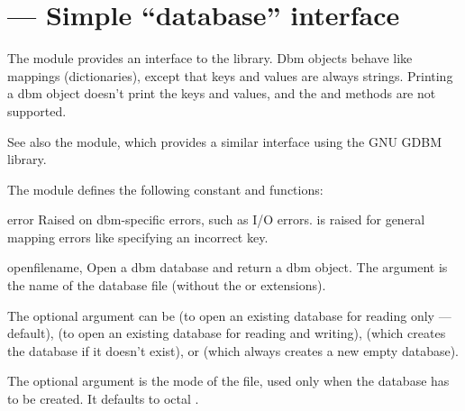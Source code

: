 \section{ ---
         Simple ``database'' interface}



The  module provides an interface to the \UNIX{}
 library.  Dbm objects behave like mappings
(dictionaries), except that keys and values are always strings.
Printing a dbm object doesn't print the keys and values, and the
 and  methods are not supported.

See also the  module, which
provides a similar interface using the GNU GDBM library.

The module defines the following constant and functions:

\begin{excdesc}{error}
Raised on dbm-specific errors, such as I/O errors.
 is raised for general mapping errors like
specifying an incorrect key.
\end{excdesc}

\begin{funcdesc}{open}{filename, }
Open a dbm database and return a dbm object.  The 
argument is the name of the database file (without the  or
 extensions).

The optional  argument can be
 (to open an existing database for reading only --- default),
 (to open an existing database for reading and writing),
 (which creates the database if it doesn't exist), or
 (which always creates a new empty database).

The optional  argument is the \UNIX{} mode of the file, used
only when the database has to be created.  It defaults to octal
.
\end{funcdesc}


\begin{seealso}
\end{seealso}
